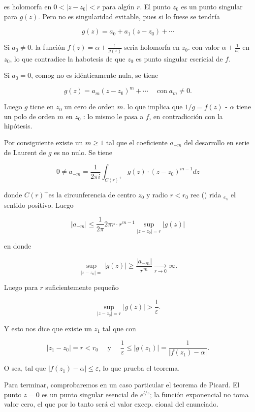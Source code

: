 \documentclass[10pt]{article}
\theoremstyle{plain}
\theoremstyle{definition}
\theoremstyle{remark}
\begin{document}
es holomorfa en $0<\left|z-z_{0}\right|<r$ para algún $r$. El punto $z_{0}$ es un punto singular para $g(z)$. Pero no es singularidad evitable, pues si lo fuese se tendría

$$
g(z)=a_{0}+a_{1}\left(z-z_{0}\right)+\cdots
$$

Si $a_{0} \neq 0$. la función $f(z)=\alpha+\frac{1}{g(z)}$ seria holomorfa en $z_{0}$. con valor $\alpha+\frac{1}{a_{0}}$ en $z_{0}$, lo que contradice la habotesis de que $z_{0}$ es punto singular esericial de $f$.

Si $a_{0}=0$, comog no es idénticamente nula, se tiene

$$
g(z)=a_{m}\left(z-z_{0}\right)^{m}+\cdots \quad \operatorname{con} a_{m} \neq 0 .
$$

Luego $g$ ticne en $z_{0}$ un cero de orden $m$. lo que implica que $1 / g=f(z)$ - $\alpha$ tiene un polo de orden $m$ en $z_{0}$ : lo mismo le pasa a $f$, en contradicción con la hipótesis.

Por consiguiente existe un $m \geqslant 1$ tal que el coeficiente $a_{-m}$ del desarrollo en serie de Laurent de $g$ es no nulo. Se tiene

$$
0 \neq a_{-m}=\frac{1}{2 \pi i} \int_{C(r)^{+}} g(z) \cdot\left(z-z_{0}\right)^{m-1} d z
$$

donde $C(r)^{+}$es la circunferencia de centro $z_{0}$ y radio $r<r_{0}$ rec () rida ${ }_{e_{n}}$ el sentido positivo. Luego

$$
\left|a_{-m}\right| \leqslant \frac{1}{2 \pi} 2 \pi r \cdot r^{m-1} \sup _{\left|z-z_{0}\right|=r}|g(z)|
$$

en donde

$$
\sup _{\left|z-z_{0}\right|=}|g(z)| \geqslant \frac{\left|a_{-m}\right|}{r^{m}} \xrightarrow[r \longrightarrow 0]{ } \infty .
$$

Luego para $r$ suficientemente pequeño

$$
\sup _{\left|z-z_{0}\right|=r}|g(z)|>\frac{1}{\varepsilon} .
$$

Y esto nos dice que existe un $z_{1}$ tal que con

$$
\left|z_{1}-z_{0}\right|=r<r_{0} \quad \text { y } \quad \frac{1}{\varepsilon} \leqslant\left|g\left(z_{1}\right)\right|=\frac{1}{\left|f\left(z_{1}\right)-\alpha\right|} .
$$

O sea, tal que $\left|f\left(z_{1}\right)-\alpha\right| \leqslant \varepsilon$, lo que prueba el teorema.

Para terminar, comprobaremos en un caso particular el teorema de Picard. El punto $z=0$ es un punto singular esencial de $e^{l / z}$; la función exponencial no toma valor cero, el que por lo tanto será el valor excep. cional del enunciado.
\end{document}
